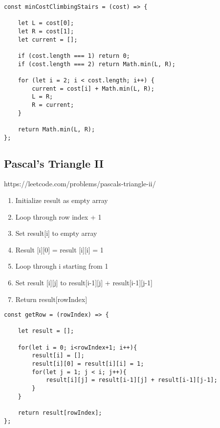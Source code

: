 \documentclass[10pt]{article}
\begin{document}
\begin{lstlisting}[title=Solution minCostClimbingStairs, captionpos=t]
const minCostClimbingStairs = (cost) => {

    let L = cost[0];
    let R = cost[1];
    let current = [];
    
    if (cost.length === 1) return 0;
    if (cost.length === 2) return Math.min(L, R);
    
    for (let i = 2; i < cost.length; i++) {
        current = cost[i] + Math.min(L, R);
        L = R;
        R = current;
    }

    return Math.min(L, R);
};
\end{lstlisting}

\medskip %










\pagebreak %
\medskip   
\subsection{Pascal's Triangle II}
https://leetcode.com/problems/pascals-triangle-ii/

\begin{enumerate}
	\item Initialize result as empty array
	\item Loop through row index + 1
	\item Set result[i] to empty array
	\item Result [i][0] = result [i][i] = 1
	\item Loop through i starting from 1
	\item Set result [i][j] to result[i-1][j] + result[i-1][j-1]
	\item Return result[rowIndex]
\end{enumerate}

\begin{lstlisting}[title=Solution getRow, captionpos=t]
const getRow = (rowIndex) => {

    let result = [];
    
    for(let i = 0; i<rowIndex+1; i++){
        result[i] = [];
        result[i][0] = result[i][i] = 1;
        for(let j = 1; j < i; j++){
            result[i][j] = result[i-1][j] + result[i-1][j-1];
        }
    }
    
    return result[rowIndex];
};
\end{lstlisting}
\end{document}
